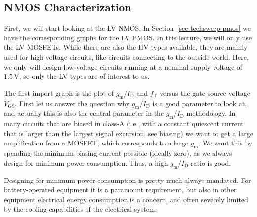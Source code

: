 \documentclass[
  a4paper,
  DIV=11,
  numbers=noendperiod]{scrartcl}
\begin{document}
\subsection{NMOS Characterization}\label{sec-techsweep-nmos}

First, we will start looking at the LV NMOS. In
Section~\ref{sec-techsweep-pmos} we have the corresponding graphs for
the LV PMOS. In this lecture, we will only use the LV MOSFETs. While
there are also the HV types available, they are mainly used for
high-voltage circuits, like circuits connecting to the outside world.
Here, we only will design low-voltage circuits running at a nominal
supply voltage of \(1.5\,\text{V}\), so only the LV types are of
interest to us.

The first import graph is the plot of \(g_\mathrm{m}/I_\mathrm{D}\) and
\(f_\mathrm{T}\) versus the gate-source voltage \(V_\mathrm{GS}\). First
let us answer the question why \(g_\mathrm{m}/I_\mathrm{D}\) is a good
parameter to look at, and actually this is also the central parameter in
the \(g_\mathrm{m}/I_\mathrm{D}\) methodology. In many circuits that are
biased in class-A (i.e., with a constant quiescent current that is
larger than the largest signal excursion, see
\href{https://en.wikipedia.org/wiki/Power_amplifier_classes\#Class_A}{biasing})
we want to get a large amplification from a MOSFET, which corresponds to
a large \(g_\mathrm{m}\). We want this by spending the minimum biasing
current possible (ideally zero), as we always design for minimum power
consumption. Thus, a high \(g_\mathrm{m}/I_\mathrm{D}\) ratio is good.

\begin{tcolorbox}[enhanced jigsaw, titlerule=0mm, left=2mm, coltitle=black, toprule=.15mm, breakable, opacitybacktitle=0.6, colframe=quarto-callout-note-color-frame, bottomtitle=1mm, toptitle=1mm, opacityback=0, colbacktitle=quarto-callout-note-color!10!white, title=\textcolor{quarto-callout-note-color}{\faInfo}\hspace{0.5em}{Power Consumption}, arc=.35mm, rightrule=.15mm, colback=white, bottomrule=.15mm, leftrule=.75mm]

Designing for minimum power consumption is pretty much always mandated.
For battery-operated equipment it is a paramount requirement, but also
in other equipment electrical energy consumption is a concern, and often
severely limited by the cooling capabilities of the electrical system.

\end{tcolorbox}
\end{document}
